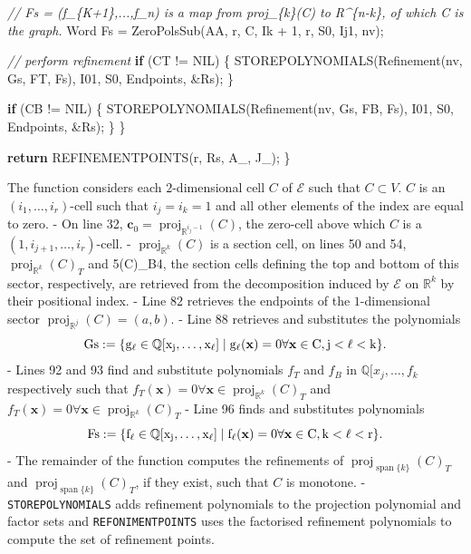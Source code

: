 \documentclass[
]{book}
\newenvironment{Shaded}{\begin{snugshade}}{\end{snugshade}}
\newcommand{\CommentTok}[1]{\textcolor[rgb]{0.56,0.35,0.01}{\textit{#1}}}
\newcommand{\ControlFlowTok}[1]{\textcolor[rgb]{0.13,0.29,0.53}{\textbf{#1}}}
\newcommand{\DecValTok}[1]{\textcolor[rgb]{0.00,0.00,0.81}{#1}}
\newcommand{\NormalTok}[1]{#1}
\theoremstyle{definition}
\theoremstyle{definition}
\theoremstyle{definition}
\theoremstyle{definition}
\theoremstyle{remark}
\begin{document}
\begin{Shaded}
\begin{Highlighting}[numbers=left,,]
        \CommentTok{// Fs = (f\_\{K+1\},...,f\_n) is a map from proj\_\{k\}(C) to R\^{}\{n{-}k\}, of which C is the graph.}
\NormalTok{        Word Fs = ZeroPolsSub(AA, r, C, Ik + }\DecValTok{1}\NormalTok{, r, S0, Ij1, nv);}

        \CommentTok{// perform refinement}
        \ControlFlowTok{if}\NormalTok{ (CT != NIL) \{}
\NormalTok{            STOREPOLYNOMIALS(Refinement(nv, Gs, FT, Fs), I01, S0, Endpoints, \&Rs);}
\NormalTok{        \}}

        \ControlFlowTok{if}\NormalTok{ (CB != NIL) \{}
\NormalTok{            STOREPOLYNOMIALS(Refinement(nv, Gs, FB, Fs), I01, S0, Endpoints, \&Rs);}
\NormalTok{        \}}
\NormalTok{    \}}

    \ControlFlowTok{return}\NormalTok{ REFINEMENTPOINTS(r, Rs, A\_, J\_);}
\NormalTok{\}}
\end{Highlighting}
\end{Shaded}

The function considers each \(2\)-dimensional cell \(C\) of \(\mathcal{E}\) such that \(C\subset V\). \(C\) is an \((i_1,\ldots,i_r)\)-cell such that \(i_j = i_k = 1\) and all other elements of the index are equal to zero.
- On line 32, \(\mathbf{c}_0 = {\operatorname{proj}_{\mathbb{R}^{i_j - 1}}}(C)\), the zero-cell above which \(C\) is a \((1,i_{j+1},\ldots,i_r)\)-cell.
- \({\operatorname{proj}_{\mathbb{R}^{k}}}(C)\) is a section cell, on lines 50 and 54, \({\operatorname{proj}_{\mathbb{R}^{k}}}(C)_T\) and 5(C)\_B4, the section cells defining the top and bottom of this sector, respectively, are retrieved from the decomposition induced by \(\mathcal{E}\) on \(\mathbb{R}^k\) by their positional index.
- Line \(82\) retrieves the endpoints of the \(1\)-dimensional sector \({\operatorname{proj}_{\mathbb{R}^{j}}}(C) = (a,b)\).
- Line 88 retrieves and substitutes the polynomials
\[
  \rm{Gs} := \{ g_\ell \in \mathbb{Q}[x_j,\ldots,x_\ell] \mid g_\ell(\mathbf{x}) = 0 \forall \mathbf{x} \in C, j < \ell < k \}.
  \]
- Lines 92 and 93 find and substitute polynomials \(f_T\) and \(f_B\) in \(\mathbb{Q}[x_j, \ldots, f_k\) respectively such that \(f_T(\mathbf{x}) = 0 \forall \mathbf{x} \in {\operatorname{proj}_{\mathbb{R}^{k}}}(C)_T\) and \(f_T(\mathbf{x}) = 0 \forall \mathbf{x} \in {\operatorname{proj}_{\mathbb{R}^{k}}}(C)_T\)
- Line 96 finds and substitutes polynomials
\[
  \rm{Fs} := \{ f_\ell \in \mathbb{Q}[x_j,\ldots,x_\ell] \mid f_\ell(\mathbf{x}) = 0 \forall \mathbf{x} \in C, k < \ell < r \}.
  \]
- The remainder of the function computes the refinements of \({\operatorname{proj}_{{\operatorname{span} \{k\}}}}(C)_T\) and \({\operatorname{proj}_{{\operatorname{span} \{k\}}}}(C)_T\), if they exist, such that \(C\) is monotone.
- \texttt{STOREPOLYNOMIALS} adds refinement polynomials to the projection polynomial and factor sets and \texttt{REFONIMENTPOINTS} uses the factorised refinement polynomials to compute the set of refinement points.
\end{document}
